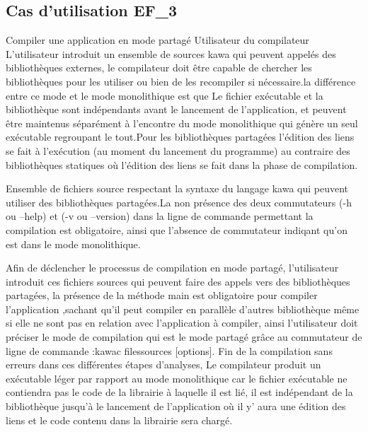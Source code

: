 \subsection{Cas d'utilisation EF\_3}
\fiche
{Compiler une application en mode partagé}                    %
{Utilisateur du compilateur}                               %
{                                                %
  L’utilisateur introduit un ensemble de sources kawa
 qui peuvent appelés des bibliothèques externes, le compilateur doit être capable de chercher les bibliothèques pour les utiliser ou bien  de les recompiler si nécessaire.la différence entre ce mode et le mode monolithique est que Le fichier exécutable et la bibliothèque sont indépendants avant le lancement de l’application, et peuvent être maintenus séparément à l'encontre du mode monolithique qui génère un seul exécutable regroupant le tout.Pour les bibliothèques partagées l'édition des liens se fait à l’exécution (au moment du lancement du programme) au contraire des bibliothèques statiques où l'édition des liens se fait dans la phase de compilation. 
}
{
	Ensemble de fichiers source respectant la syntaxe du langage kawa qui peuvent utiliser des bibliothèques partagées.La non présence des deux commutateurs (-h ou --help) et (-v ou --version) dans la ligne de commande permettant la compilation est obligatoire, ainsi que l'absence de commutateur indiqant qu'on est dans le mode monolithique. 
	
}                                                %
{Afin de déclencher le processus de compilation en mode partagé, l'utilisateur introduit ces fichiers sources qui peuvent faire des appels vers des bibliothèques partagées, la présence de la méthode main est obligatoire pour compiler l'application ,sachant qu'il peut compiler en parallèle d'autres bibliothèque même si elle ne sont pas en relation avec l'application à compiler, ainsi  l'utilisateur doit préciser le mode de compilation qui est le mode partagé grâce au commutateur de ligne de commande :kawac filessources [options].}  %
{
Fin de la compilation sans erreurs dans ces différentes étapes d'analyses, Le compilateur produit un exécutable léger par rapport au mode monolithique car le fichier exécutable ne contiendra pas le code de la librairie à laquelle il est lié, il est indépendant de la bibliothèque jusqu'à le lancement de l'application où il y' aura une édition des liens et le code contenu dans la librairie sera chargé.} %
